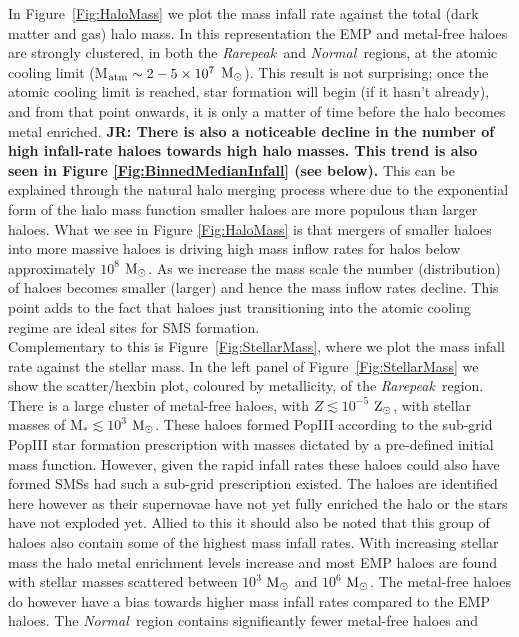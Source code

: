 \documentclass[twocolumn,iop,revtex4]{openjournal}
\newcommand{\msolar} {$\rm{M_{\odot}}~$}
\newcommand{\msolarc} {$\rm{M_{\odot}}$}
\newcommand{\zsolarc} {$\rm{Z_{\odot}}$}
\newcommand{\rarepeak} {\textit{Rarepeak~}}
\newcommand{\normal} {\textit{Normal~}}
\def\jr#1{{\color{blue} \bf JR:  #1}}
\begin{document}
In Figure~\ref{Fig:HaloMass} we plot the mass infall rate against the total (dark matter
and gas) halo mass. In this representation the EMP and metal-free haloes are strongly clustered, in both
the \rarepeak and \normal regions, at the atomic cooling limit (M$_{\rm atm} \sim 2 - 5 \times 10^7$
\msolarc). This result is not surprising; once the atomic cooling limit is reached, star formation
will begin (if it hasn't already), and from that point onwards, it is only a matter of time before
the halo becomes metal enriched. \jr{There is also a noticeable decline in the number of high infall-rate
haloes towards high halo masses. This trend is also seen in Figure \ref{Fig:BinnedMedianInfall} (see below).}
This can be explained through the natural halo merging process where due to the exponential form of the halo mass
function smaller haloes are more populous than larger haloes. What we see in Figure \ref{Fig:HaloMass} is that mergers of smaller haloes
into more massive haloes is driving high mass inflow rates for halos below approximately $10^{8}$ \msolarc. As we increase the mass
scale the number (distribution) of haloes becomes smaller (larger) and hence the mass inflow rates decline. This point adds to
the fact that haloes just transitioning into the atomic cooling regime are ideal sites for SMS formation. \\
\indent Complementary to this is Figure~\ref{Fig:StellarMass}, 
where we plot the mass infall rate against the stellar mass. In the left panel of Figure~\ref{Fig:StellarMass}
we show the scatter/hexbin plot, coloured by metallicity, of the
\rarepeak region. There is a large cluster of metal-free haloes, with $Z \lesssim 10^{-5}$ \zsolarc,
with stellar masses of M$_{*} \lesssim 10^3$ \msolarc. These haloes formed PopIII
according to the sub-grid PopIII star formation prescription with masses dictated 
by a pre-defined initial mass function. However, given the rapid infall rates these 
haloes could also have formed SMSs had such a sub-grid prescription existed. The
haloes are identified here however as their supernovae have not yet fully enriched the 
halo or the stars have not exploded yet. Allied to this 
it should also be noted that this group of haloes also contain some of the highest mass infall
rates. With increasing stellar mass the halo metal enrichment levels increase and most EMP haloes
are found with stellar masses scattered between $10^{3}$ \msolar and $10^{6}$ \msolarc. The metal-free haloes
do however have a bias towards higher mass infall rates compared to the EMP haloes.
The \normal region contains significantly fewer metal-free haloes and
\end{document}
